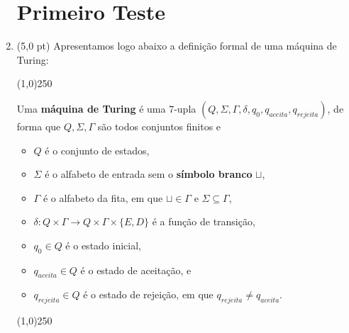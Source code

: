 \documentclass[12pt,a4paper,oneside]{article}
\begin{document}
\begin{enumerate}
	
	\section*{Primeiro Teste}
	
	\item (5,0 pt) Apresentamos logo abaixo a definição formal de uma máquina de Turing:
	
	\begin{center}
	\line(1,0){250}
	\end{center}	
	
	Uma {\bf máquina de Turing} é uma 7-upla $(Q, \Sigma, \Gamma, \delta, q_0, q_{aceita}, q_{rejeita})$, de forma que $Q, \Sigma, \Gamma$ são todos conjuntos finitos e
	
		\begin{itemize}
			\item $Q$ é o conjunto de estados,
			\item $\Sigma$ é o alfabeto de entrada sem o {\bf símbolo branco} $\sqcup$,
			\item $\Gamma$ é o alfabeto da fita, em que $\sqcup \in \Gamma$ e $\Sigma \subseteq \Gamma$,
			\item $\delta : Q \times \Gamma \rightarrow Q \times \Gamma \times \{E, D\}$ é a função de transição,
			\item $q_0 \in Q$ é o estado inicial,
			\item $q_{aceita} \in Q$ é o estado de aceitação, e
			\item $q_{rejeita} \in Q$ é o estado de rejeição, em que $q_{rejeita} \not= q_{aceita}$.
		\end{itemize}
		
	\begin{center}
	\line(1,0){250}
	\end{center}		
		

\end{enumerate}
\end{document}
